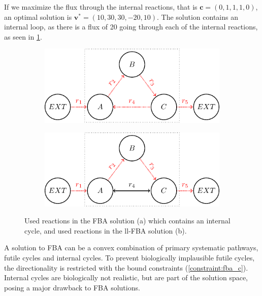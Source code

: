 If we maximize the flux through the internal reactions, that is $\mathbf c = (0,1,1,1,0)$, an optimal solution is $\mathbf v^* = (10, 30, 30, -20, 10)$. The solution contains an internal loop, as there is a flux of 20 going through each of the internal reactions, as seen in \cref{fig:loop_solutions}.

\begin{figure}[H]
    \centering
    \begin{subfigure}{0.5\textwidth}
    \centering
        \includegraphics[width=0.99\linewidth]{Images/tikz_graphs_one_loop_fba.pdf}
        \caption{}
    \end{subfigure}%
    \begin{subfigure}{0.5\textwidth}
    \centering
        \includegraphics[width=0.99\linewidth]{Images/tikz_graphs_one_loop_ll_fba.pdf}
        \caption{}
    \end{subfigure}
    \caption{Used reactions in the \textsf{FBA} solution (a) which contains an internal cycle, and used reactions in the \textsf{ll-FBA} solution (b).}
    \label{fig:loop_solutions}
\end{figure}

A solution to \textsf{FBA} can be a convex combination of primary systematic pathways, futile cycles and internal cycles. To prevent biologically implausible futile cycles, the directionality is restricted with the bound constraints (\cref{constraint:fba_c}). Internal cycles are biologically not realistic, but are part of the solution space, posing a major drawback to \textsf{FBA} solutions. 

